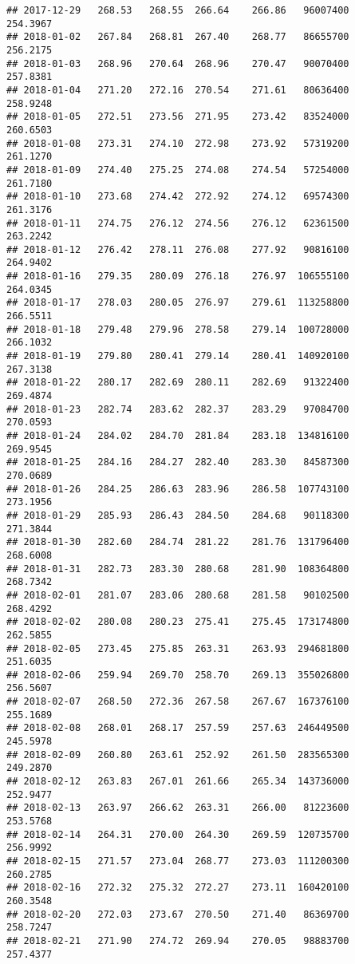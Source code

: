 \documentclass[
]{article}
\begin{document}
\begin{verbatim}
## 2017-12-29   268.53   268.55  266.64    266.86   96007400     254.3967
## 2018-01-02   267.84   268.81  267.40    268.77   86655700     256.2175
## 2018-01-03   268.96   270.64  268.96    270.47   90070400     257.8381
## 2018-01-04   271.20   272.16  270.54    271.61   80636400     258.9248
## 2018-01-05   272.51   273.56  271.95    273.42   83524000     260.6503
## 2018-01-08   273.31   274.10  272.98    273.92   57319200     261.1270
## 2018-01-09   274.40   275.25  274.08    274.54   57254000     261.7180
## 2018-01-10   273.68   274.42  272.92    274.12   69574300     261.3176
## 2018-01-11   274.75   276.12  274.56    276.12   62361500     263.2242
## 2018-01-12   276.42   278.11  276.08    277.92   90816100     264.9402
## 2018-01-16   279.35   280.09  276.18    276.97  106555100     264.0345
## 2018-01-17   278.03   280.05  276.97    279.61  113258800     266.5511
## 2018-01-18   279.48   279.96  278.58    279.14  100728000     266.1032
## 2018-01-19   279.80   280.41  279.14    280.41  140920100     267.3138
## 2018-01-22   280.17   282.69  280.11    282.69   91322400     269.4874
## 2018-01-23   282.74   283.62  282.37    283.29   97084700     270.0593
## 2018-01-24   284.02   284.70  281.84    283.18  134816100     269.9545
## 2018-01-25   284.16   284.27  282.40    283.30   84587300     270.0689
## 2018-01-26   284.25   286.63  283.96    286.58  107743100     273.1956
## 2018-01-29   285.93   286.43  284.50    284.68   90118300     271.3844
## 2018-01-30   282.60   284.74  281.22    281.76  131796400     268.6008
## 2018-01-31   282.73   283.30  280.68    281.90  108364800     268.7342
## 2018-02-01   281.07   283.06  280.68    281.58   90102500     268.4292
## 2018-02-02   280.08   280.23  275.41    275.45  173174800     262.5855
## 2018-02-05   273.45   275.85  263.31    263.93  294681800     251.6035
## 2018-02-06   259.94   269.70  258.70    269.13  355026800     256.5607
## 2018-02-07   268.50   272.36  267.58    267.67  167376100     255.1689
## 2018-02-08   268.01   268.17  257.59    257.63  246449500     245.5978
## 2018-02-09   260.80   263.61  252.92    261.50  283565300     249.2870
## 2018-02-12   263.83   267.01  261.66    265.34  143736000     252.9477
## 2018-02-13   263.97   266.62  263.31    266.00   81223600     253.5768
## 2018-02-14   264.31   270.00  264.30    269.59  120735700     256.9992
## 2018-02-15   271.57   273.04  268.77    273.03  111200300     260.2785
## 2018-02-16   272.32   275.32  272.27    273.11  160420100     260.3548
## 2018-02-20   272.03   273.67  270.50    271.40   86369700     258.7247
## 2018-02-21   271.90   274.72  269.94    270.05   98883700     257.4377

\end{verbatim}
\end{document}
